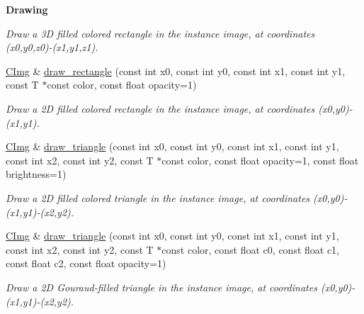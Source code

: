\begin{Indent}{\bf Drawing}
\begin{DoxyCompactItemize}
\begin{DoxyCompactList}\small\item\em Draw a 3D filled colored rectangle in the instance image, at coordinates ({\ttfamily x0},{\ttfamily y0},{\ttfamily z0})-\/({\ttfamily x1},{\ttfamily y1},{\ttfamily z1}). \item\end{DoxyCompactList}\item 
\hyperlink{structcimg__library_1_1_c_img}{CImg} \& \hyperlink{structcimg__library_1_1_c_img_a7e381d5eeece65295abefcef20b44028}{draw\_\-rectangle} (const int x0, const int y0, const int x1, const int y1, const T $\ast$const color, const float opacity=1)
\begin{DoxyCompactList}\small\item\em Draw a 2D filled colored rectangle in the instance image, at coordinates ({\ttfamily x0},{\ttfamily y0})-\/({\ttfamily x1},{\ttfamily y1}). \item\end{DoxyCompactList}\item 
\hyperlink{structcimg__library_1_1_c_img}{CImg} \& \hyperlink{structcimg__library_1_1_c_img_aa7c824a81306ef4b7420020c196cc1b0}{draw\_\-triangle} (const int x0, const int y0, const int x1, const int y1, const int x2, const int y2, const T $\ast$const color, const float opacity=1, const float brightness=1)
\begin{DoxyCompactList}\small\item\em Draw a 2D filled colored triangle in the instance image, at coordinates ({\ttfamily x0},{\ttfamily y0})-\/({\ttfamily x1},{\ttfamily y1})-\/({\ttfamily x2},{\ttfamily y2}). \item\end{DoxyCompactList}\item 
\hyperlink{structcimg__library_1_1_c_img}{CImg} \& \hyperlink{structcimg__library_1_1_c_img_adc0bb0f859b36d38e305f10ca6bf004a}{draw\_\-triangle} (const int x0, const int y0, const int x1, const int y1, const int x2, const int y2, const T $\ast$const color, const float c0, const float c1, const float c2, const float opacity=1)
\begin{DoxyCompactList}\small\item\em Draw a 2D Gouraud-\/filled triangle in the instance image, at coordinates ({\ttfamily x0},{\ttfamily y0})-\/({\ttfamily x1},{\ttfamily y1})-\/({\ttfamily x2},{\ttfamily y2}). \item\end{DoxyCompactList}\item 

\end{DoxyCompactItemize}
\end{Indent}
